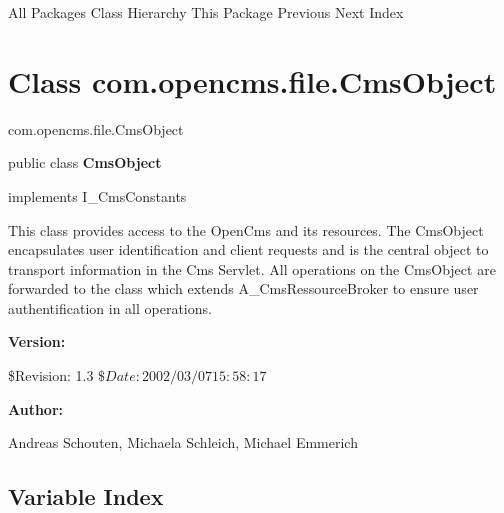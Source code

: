 \begin{PRE}
All Packages  Class Hierarchy  This Package  Previous  Next  Index
\end{PRE}

\htmlHR

\section*{  Class com.opencms.file.CmsObject }

\begin{PRE}
com.opencms.file.CmsObject
\end{PRE}

\htmlHR

\begin{description}
\item public class {\bf CmsObject}  
\item implements I\_CmsConstants 
\end{description}

This class provides access to the OpenCms and its resources. \htmlBR
The CmsObject encapsulates user identification and client requests and is the
central object to transport information in the Cms Servlet. \htmlBR
All operations on the CmsObject are forwarded to the class which extends
A\_CmsRessourceBroker to ensure user authentification in all operations. 

\begin{description}
\item {\bf Version:}  

\$Revision: 1.3 $ \$Date: 2002/03/07 15:58:17 $  
\item {\bf Author:}  

Andreas Schouten, Michaela Schleich, Michael Emmerich 
\end{description}

\htmlHR

\subsection*{  Variable Index }

